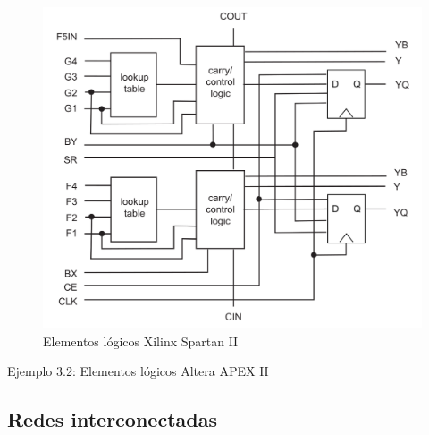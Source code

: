 \begin{figure}[H] \centering
    \includegraphics[width=0.6\linewidth]{Imagenes/03/03-Xilinx_Spartan_II.png}
    \caption{Elementos lógicos Xilinx Spartan II}%
    \label{Fig:03-Xilinx-Spartan-II}
\end{figure}

\vspace*{1em}

\begin{Ejemplo}
Ejemplo 3.2: Elementos lógicos Altera APEX II
\end{Ejemplo}


\subsection{Redes interconectadas}